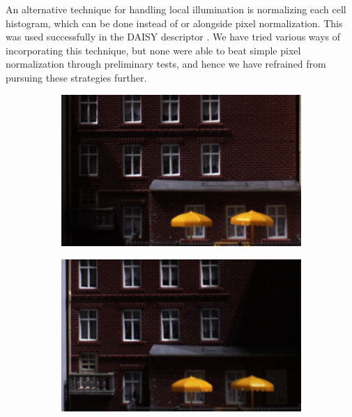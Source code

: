 \documentclass[thesis.tex]{subfiles}
\begin{document}
An alternative technique for handling local illumination is normalizing each cell histogram, which can be done instead of or alongside pixel normalization. This was used successfully in the DAISY descriptor \cite{tola2008fast}. We have tried various ways of incorporating this technique, but none were able to beat simple pixel normalization through preliminary tests, and hence we have refrained from pursuing these strategies further.
%
\begin{figure}[p]
    \centering
    \begin{subfigure}[t]{0.48\textwidth}
        \includegraphics[width=\textwidth]{img/pixelNormalizationExample1.png}
        \caption{}
        \label{fig:pixelNormalizationExample1}
    \end{subfigure}
    \begin{subfigure}[t]{0.48\textwidth}
        \includegraphics[width=\textwidth]{img/pixelNormalizationExample2.png}
        \caption{}
        \label{fig:pixelNormalizationExample2}

\end{subfigure}
\end{figure}
\end{document}
